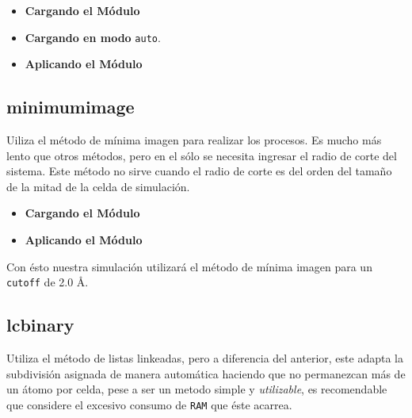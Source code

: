 \begin{itemize}
 \item \textbf{Cargando el M\'odulo}
 \item \textbf{Cargando en modo} \texttt{auto}.
 \item \textbf{Aplicando el M\'odulo}
\end{itemize}

\subsection{minimumimage}
Uiliza el m\'etodo de m\'inima imagen para realizar los procesos. Es mucho m\'as
lento que otros m\'etodos, pero en el s\'olo se necesita ingresar el radio de
corte del sistema. Este m\'etodo no sirve cuando el radio de corte es del orden
del tama\~no de la mitad de la celda de simulaci\'on.

\begin{itemize}
 \item \textbf{Cargando el M\'odulo}
 \item \textbf{Aplicando el M\'odulo}
\end{itemize}

Con \'esto nuestra simulaci\'on utilizar\'a el m\'etodo de m\'inima imagen para
un \verb|cutoff| de 2.0 \AA.

\subsection{lcbinary}
Utiliza el m\'etodo de listas linkeadas, pero a diferencia del anterior, este
adapta la subdivisi\'on asignada de manera autom\'atica haciendo que no
permanezcan m\'as de un \'atomo por celda, pese a ser un metodo simple y
\textit{utilizable}, es recomendable que considere el excesivo consumo de
\verb|RAM| que \'este acarrea.

